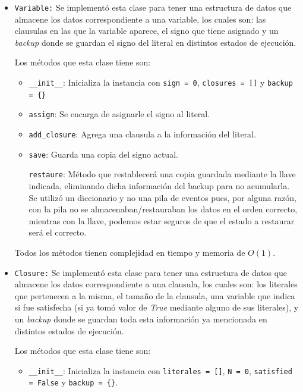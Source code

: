 \documentclass[letterpaper,12pt]{article}
\begin{document}
\begin{itemize}
	\item \texttt{Variable:} Se implementó esta clase para tener una estructura de datos que almacene los datos correspondiente a una variable, los cuales son: las clausulas en las que la variable aparece, el signo que tiene asignado y un \textit{backup} donde se guardan el signo del literal en distintos estados de ejecución.
	
	Los métodos que esta clase tiene son:
	\begin{itemize}
		\item \texttt{\_\_init\_\_}: Inicializa la instancia con \texttt{sign = 0}, \texttt{closures = []} y \texttt{backup = \{\}}
		
		\item \texttt{assign}: Se encarga de asignarle el signo al literal.
		
		\item \texttt{add\_closure}: Agrega una clausula a la información del literal.
	    
	    \item \texttt{save}: Guarda una copia del signo actual.
	    
	    \texttt{restaure}: Método que restablecerá una copia guardada mediante la llave indicada, eliminando dicha informaci\'on del backup para no acumularla. Se utiliz\'o un diccionario y no una pila de eventos pues, por alguna raz\'on, con la pila no se almacenaban/restauraban los datos en el orden correcto, mientras con la llave, podemos estar seguros de que el estado a restaurar ser\'a el correcto.
	\end{itemize}
	
	Todos los m\'etodos tienen complejidad en tiempo y memoria de $O(1)$.

	\item \texttt{Closure:} Se implementó esta clase para tener una estructura de datos que almacene los datos correspondiente a una clausula, los cuales son: los literales que pertenecen a la misma, el tamaño de la clausula, una variable que indica si fue satisfecha (si ya tomó valor de \textit{True} mediante alguno de sus literales), y un \textit{backup} donde se guardan toda esta informaci\'on ya mencionada en distintos estados de ejecución.
	
	Los métodos que esta clase tiene son:
	\begin{itemize}
		\item \texttt{\_\_init\_\_}: Inicializa la instancia con \texttt{literales = []}, \texttt{N = 0}, \texttt{satisfied = False} y \texttt{backup = \{\}}.
		

\end{itemize}
\end{itemize}
\end{document}
